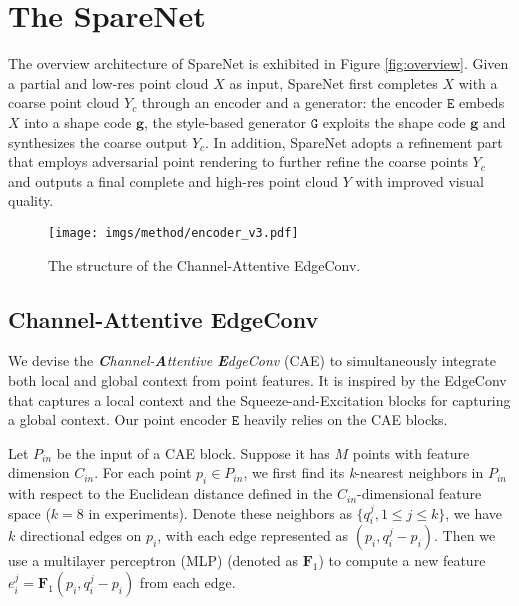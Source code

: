 \documentclass[final]{cvpr}
\begin{document}
\section{The SpareNet}

The overview architecture of SpareNet is exhibited in Figure \ref{fig:overview}. Given a partial and low-res point cloud $X$ as input, SpareNet first completes $X$ with a coarse point cloud $Y_c$ through an encoder and a generator: the encoder $\mathtt{E}$ embeds $X$ into a shape code $\mathbf{g}$, the style-based generator $\mathtt{G}$ exploits the shape code $\mathbf{g}$ and synthesizes the coarse output $Y_c$. In addition, SpareNet adopts a refinement part that employs adversarial point rendering to further refine the coarse points $Y_c$ and outputs a final complete and high-res point cloud $Y$ with improved visual quality.







\begin{figure}[t]
\centering
\texttt{[image: imgs/method/encoder\_v3.pdf]}
 \footnotesize
    \caption{The structure of the Channel-Attentive EdgeConv.}
\label{fig:encoder}
\vspace{-1em}
\end{figure}

\subsection{Channel-Attentive EdgeConv}
\label{ssec:edgeconv}

We devise the \emph{\textbf{C}hannel-\textbf{A}ttentive \textbf{E}dgeConv} (CAE) to simultaneously integrate both local and global context from point features. It is inspired by the EdgeConv \cite{dgcnn} that captures a local context and the Squeeze-and-Excitation blocks \cite{hu2018senet} for capturing a global context. Our point encoder $\mathtt{E}$ heavily relies on the CAE blocks. 


Let $P_{in}$ be the input of a CAE block. Suppose it has $M$ points with feature dimension $C_{in}$. 
For each point $p_i \in P_{in}$, we first find its \emph{k}-nearest neighbors in $P_{in}$ with respect to the Euclidean distance defined in the $C_{in}$-dimensional feature space ($k=8$ in experiments). 
Denote these neighbors as $\{q_i^j, 1\leq j \leq k\}$, we have $k$ directional edges on $p_i$, with each edge represented as $(p_i, q_i^j - p_i)$. Then we use a multilayer perceptron (MLP) (denoted as $\mathbf{F}_1$) to compute a new feature $e_i^j= \mathbf{F}_1(p_i, q_i^j - p_i)$ from each edge.
\end{document}
